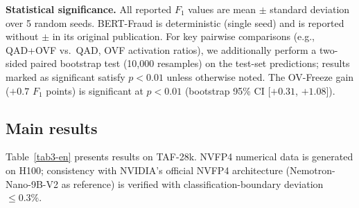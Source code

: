 \documentclass[11pt, a4paper]{article}
\begin{document}
\medskip
\noindent\textbf{Statistical significance.} All reported $F_1$ values are mean $\pm$ standard deviation over 5 random seeds. BERT-Fraud is deterministic (single seed) and is reported without $\pm$ in its original publication. For key pairwise comparisons (e.g., QAD+OVF vs.\ QAD, OVF activation ratios), we additionally perform a two-sided paired bootstrap test (10{,}000 resamples) on the test-set predictions; results marked as significant satisfy $p<0.01$ unless otherwise noted. The OV-Freeze gain ($+0.7$ $F_1$ points) is significant at $p<0.01$ (bootstrap 95\% CI [$+0.31$, $+1.08$]).

\subsection{Main results}

Table~\ref{tab3-en} presents results on TAF-28k. NVFP4 numerical data is generated on H100; consistency with NVIDIA's official NVFP4 architecture (Nemotron-Nano-9B-V2 as reference) is verified with classification-boundary deviation $\le 0.3\%$.
\end{document}
